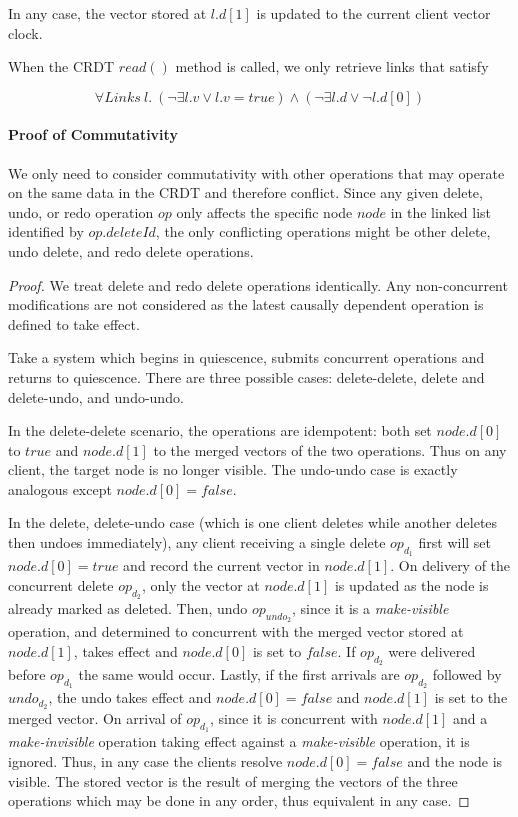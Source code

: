 \documentclass[12pt,a4paper,twoside,openright]{report}
\begin{document}
			In any case, the vector stored at $l.d[1]$ is updated to the current client vector clock.
			
			When the CRDT $read()$ method is called, we only retrieve links that satisfy
			
					\[\forall Links\ l.\  (\lnot\exists l.v \lor l.v = true) \land (\lnot\exists l.d \lor \lnot l.d[0]) \] 
						
			
			\paragraph{Proof of Commutativity}
			
			We only need to consider commutativity with other operations that may operate on the same data in the CRDT and therefore conflict. Since any given delete, undo, or redo operation $op$ only affects the specific node $node$ in the linked list identified by $op.deleteId$, the only conflicting operations might be other delete, undo delete, and redo delete operations.
						
			\begin{proof}
				We treat delete and redo delete operations identically. Any non-concurrent modifications are not considered as the latest causally dependent operation is defined to take effect.
				
				Take a system which begins in quiescence, submits concurrent operations and returns to quiescence. There are three possible cases: delete-delete, delete and delete-undo, and undo-undo.
				
				In the delete-delete scenario, the operations are idempotent: both set $node.d[0]$ to $true$ and $node.d[1]$ to the merged vectors of the two operations. Thus on any client, the target node is no longer visible. The undo-undo case is exactly analogous except $node.d[0] = false$. 
				
				In the delete, delete-undo case (which is one client deletes while another deletes then undoes immediately), any client receiving a single delete $op_{d_1}$ first will set $node.d[0] = true$ and record the current vector in $node.d[1]$. On delivery of the concurrent delete $op_{d_2}$, only the vector at $node.d[1]$ is updated as the node is already marked as deleted. Then, undo $op_{undo_2}$, since it is a \textit{make-visible} operation, and determined to concurrent with the merged vector stored at $node.d[1]$, takes effect and $node.d[0]$ is set to $false$. If $op_{d_2}$ were delivered before $op_{d_1}$ the same would occur. Lastly, if the first arrivals are $op_{d_2}$ followed by $undo_{d_2}$, the undo takes effect and $node.d[0] = false$ and $node.d[1]$ is set to the merged vector. On arrival of $op_{d_1}$, since it is concurrent with $node.d[1]$ and a \textit{make-invisible} operation taking effect against a \textit{make-visible} operation, it is ignored. Thus, in any case the clients resolve $node.d[0] = false$ and the node is visible. The stored vector is the result of merging the vectors of the three operations which may be done in any order, thus equivalent in any case.
				
			\end{proof}
			
\end{document}

